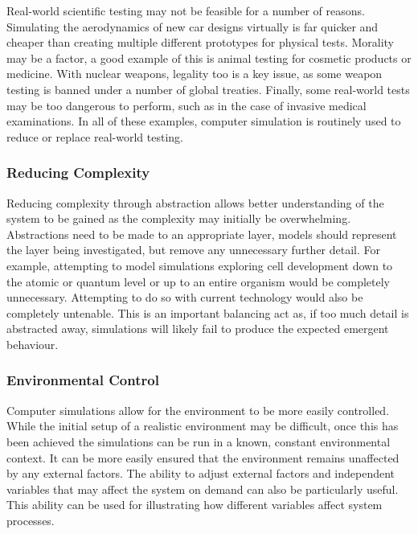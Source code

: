 \documentclass{UoYCSproject}
\begin{document}
Real-world scientific testing may not be feasible for a number of reasons.
Simulating the aerodynamics of new car designs virtually is far quicker and cheaper than creating multiple different prototypes for physical tests.
Morality may be a factor, a good example of this is animal testing for cosmetic products or medicine.
With nuclear weapons, legality too is a key issue, as some weapon testing is banned under a number of global treaties\cite{partial_nuclear_test_ban_treaty, threshold_test_ban_treaty}.
Finally, some real-world tests may be too dangerous to perform, such as in the case of invasive medical examinations.
In all of these examples, computer simulation is routinely used to reduce or replace real-world testing.

\subsubsection{Reducing Complexity}
Reducing complexity through abstraction allows better understanding of the system to be gained as the complexity may initially be overwhelming.
Abstractions need to be made to an appropriate layer, models should represent the layer being investigated, but remove any unnecessary further detail.
For example, attempting to model simulations exploring cell development down to the atomic or quantum level or up to an entire organism would be completely unnecessary.
Attempting to do so with current technology would also be completely untenable.
This is an important balancing act as, if too much detail is abstracted away, simulations will likely fail to produce the expected emergent behaviour\cite{stepney_abm}.

\subsubsection{Environmental Control}
Computer simulations allow for the environment to be more easily controlled.
While the initial setup of a realistic environment may be difficult, once this has been achieved the simulations can be run in a known, constant environmental context.
It can be more easily ensured that the environment remains unaffected by any external factors.
The ability to adjust external factors and independent variables that may affect the system on demand can also be particularly useful.
This ability can be used for illustrating how different variables affect system processes.
\end{document}
